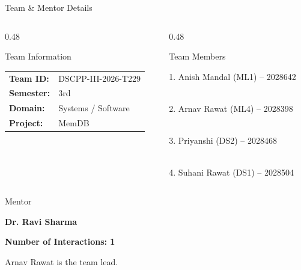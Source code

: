 \documentclass[aspectratio=169,10pt]{beamer}
\begin{document}
\begin{frame}{Team \& Mentor Details}

\begin{columns}[T]

\begin{column}{0.48\textwidth}

\begin{block}{Team Information}

\begin{tabular}{@{}ll@{}}

\textbf{Team ID:} & DSCPP-III-2026-T229 \\[2mm]

\textbf{Semester:} & 3rd \\[2mm]

\textbf{Domain:} & Systems / Software \\[2mm]

\textbf{Project:} & MemDB

\end{tabular}

\end{block}

\end{column}

\begin{column}{0.48\textwidth}

\begin{block}{Team Members}

\small

1. Anish Mandal (ML1) -- 2028642

\\[2mm]

2. Arnav Rawat (ML4) -- 2028398

\\[2mm]

3. Priyanshi (DS2) -- 2028468

\\[2mm]

4. Suhani Rawat (DS1) -- 2028504

\end{block}

\end{column}

\end{columns}

\vspace{3mm}

\begin{block}{Mentor}

\textbf{Dr. Ravi Sharma}

\hfill

\textbf{Number of Interactions: 1}

\end{block}

\vspace{2mm}

\small
\textcolor{GEUGrey}{
Arnav Rawat is the team lead.
}

\end{frame}
\end{document}
